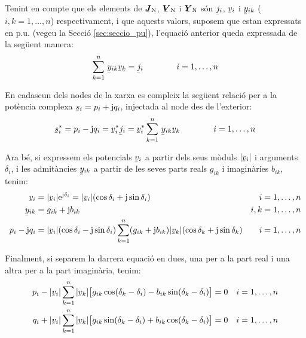 Tenint en compte que els elements de $\mcmplx{J}\ped{N}$,
$\mcmplx{V}\ped{N}$ i $\mcmplx{Y}\ped{N}$ s\'{o}n $\cmplx{j}_i$,
$\cmplx{v}_i$ i  $\cmplx{y}_{ik}$ ($i,k=1,\ldots,n$) respectivament,
i que aquests valors, suposem que estan expressats en p.u. (vegeu la
Secci\'{o} \ref{sec:seccio_pu}), l'equaci\'{o} anterior queda expressada de
la seg\"{u}ent manera:
\begin{equation}
    \sum^n_{k=1}\, \cmplx{y}_{ik} \cmplx{v}_k = \cmplx{j}_i \qquad\qquad i=1,\ldots,n
\end{equation}

En cadascun dels nodes de la xarxa es compleix la seg\"{u}ent relaci\'{o} per a la pot\`{e}ncia
complexa $\cmplx{s}_i = p_i + \ju q_i$, injectada al node des de l'exterior:
\begin{equation}
    \cmplx{s}_i^* = p_i - \ju q_i = \cmplx{v}_i^* \cmplx{j}_i = \cmplx{v}_i^*
    \sum^n_{k=1}\, \cmplx{y}_{ik} \cmplx{v}_k \qquad\qquad i=1,\ldots,n \label{eq:sconj}
\end{equation}

Ara b\'{e}, si expressem els potencials $\cmplx{v}_i$ a partir dels seus m\`{o}duls $|\cmplx{v}_i|$
i arguments $\delta_i$, i les admit\`{a}ncies $\cmplx{y}_{ik}$ a partir de les seves parts
reals $g_{ik}$ i imagin\`{a}ries $b_{ik}$, tenim:
\begin{align}
    \cmplx{v}_i &=|\cmplx{v}_i| \eu^{\ju\delta_i} = |\cmplx{v}_i|
    (\cos\delta_i+\ju\sin\delta_i) & i & =1,\ldots,n\\
    \cmplx{y}_{ik} &= g_{ik} + \ju b_{ik} & i,k & =1,\ldots,n \\
    p_i - \ju q_i &= |\cmplx{v}_i| (\cos\delta_i - \ju\sin\delta_i) \sum^n_{k=1} (g_{ik} + \ju
    b_{ik}) |\cmplx{v}_k| (\cos\delta_k + \ju\sin\delta_k) & i & =1,\ldots,n
\end{align}

Finalment, si separem la darrera equaci\'{o} en dues, una per a  la part real i  una altra per
a la part imagin\`{a}ria, tenim:
\begin{align}
    p_i - |\cmplx{v}_i| \sum^n_{k=1}  |\cmplx{v}_k| \bigl[ g_{ik} \cos(\delta_k - \delta_i) -
     b_{ik} \sin(\delta_k - \delta_i) \bigr] &= 0  & i&=1,\ldots,n\label{eq:p0} \\
    q_i + |\cmplx{v}_i| \sum^n_{k=1}  |\cmplx{v}_k| \bigl[ g_{ik} \sin(\delta_k - \delta_i) +
      b_{ik} \cos(\delta_k - \delta_i) \bigr] &= 0 & i&=1,\ldots,n\label{eq:q0}
\end{align}

